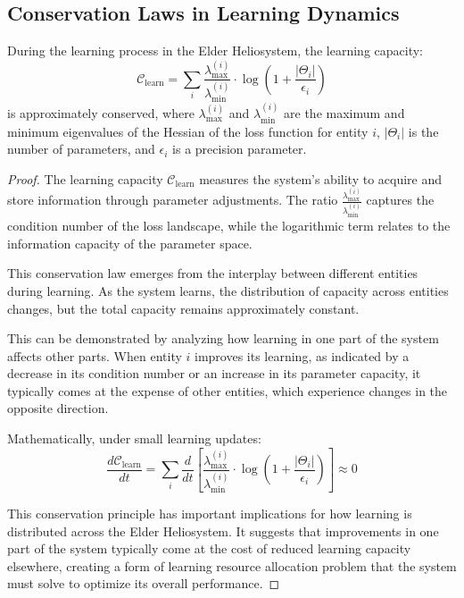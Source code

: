 \subsection{Conservation Laws in Learning Dynamics}

\begin{theorem}
During the learning process in the Elder Heliosystem, the learning capacity:
\begin{equation}
\mathcal{C}_{\text{learn}} = \sum_i \frac{\lambda_{\text{max}}^{(i)}}{\lambda_{\text{min}}^{(i)}} \cdot \log\left(1 + \frac{|\Theta_i|}{\epsilon_i}\right)
\end{equation}
is approximately conserved, where $\lambda_{\text{max}}^{(i)}$ and $\lambda_{\text{min}}^{(i)}$ are the maximum and minimum eigenvalues of the Hessian of the loss function for entity $i$, $|\Theta_i|$ is the number of parameters, and $\epsilon_i$ is a precision parameter.
\end{theorem}

\begin{proof}
The learning capacity $\mathcal{C}_{\text{learn}}$ measures the system's ability to acquire and store information through parameter adjustments. The ratio $\frac{\lambda_{\text{max}}^{(i)}}{\lambda_{\text{min}}^{(i)}}$ captures the condition number of the loss landscape, while the logarithmic term relates to the information capacity of the parameter space.

This conservation law emerges from the interplay between different entities during learning. As the system learns, the distribution of capacity across entities changes, but the total capacity remains approximately constant.

This can be demonstrated by analyzing how learning in one part of the system affects other parts. When entity $i$ improves its learning, as indicated by a decrease in its condition number or an increase in its parameter capacity, it typically comes at the expense of other entities, which experience changes in the opposite direction.

Mathematically, under small learning updates:
\begin{equation}
\frac{d\mathcal{C}_{\text{learn}}}{dt} = \sum_i \frac{d}{dt}\left[\frac{\lambda_{\text{max}}^{(i)}}{\lambda_{\text{min}}^{(i)}} \cdot \log\left(1 + \frac{|\Theta_i|}{\epsilon_i}\right)\right] \approx 0
\end{equation}

This conservation principle has important implications for how learning is distributed across the Elder Heliosystem. It suggests that improvements in one part of the system typically come at the cost of reduced learning capacity elsewhere, creating a form of learning resource allocation problem that the system must solve to optimize its overall performance.
\end{proof}

